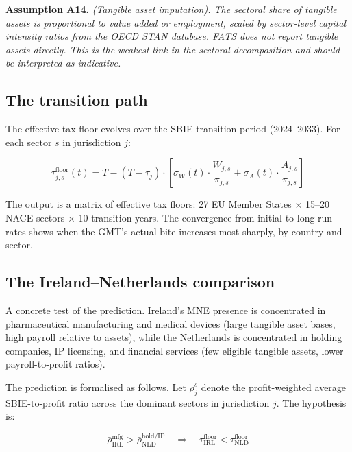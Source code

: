 \documentclass[11pt,a4paper]{article}
\newcommand{\assumption}[2]{\noindent\textbf{Assumption #1.} \textit{#2}\medskip}
\begin{document}
\assumption{A14}{(Tangible asset imputation). The sectoral share of tangible assets is proportional to value added or employment, scaled by sector-level capital intensity ratios from the OECD STAN database. FATS does not report tangible assets directly. This is the weakest link in the sectoral decomposition and should be interpreted as indicative.}

\subsection{The transition path}\label{sec:transition}

The effective tax floor evolves over the SBIE transition period (2024--2033). For each sector $s$ in jurisdiction $j$:

\begin{equation}\label{eq:floor_transition}
\tau_{j,s}^{\text{floor}}(t) = T - (T - \tau_j) \cdot \left[\sigma_W(t) \cdot \frac{W_{j,s}}{\pi_{j,s}} + \sigma_A(t) \cdot \frac{A_{j,s}}{\pi_{j,s}}\right]
\end{equation}

The output is a matrix of effective tax floors: 27 EU Member States $\times$ 15--20 NACE sectors $\times$ 10 transition years. The convergence from initial to long-run rates shows when the GMT's actual bite increases most sharply, by country and sector.

\subsection{The Ireland--Netherlands comparison}\label{sec:irl_nld}

A concrete test of the \citet{schjelderup2024} prediction. Ireland's MNE presence is concentrated in pharmaceutical manufacturing and medical devices (large tangible asset bases, high payroll relative to assets), while the Netherlands is concentrated in holding companies, IP licensing, and financial services (few eligible tangible assets, lower payroll-to-profit ratios).

The prediction is formalised as follows. Let $\bar{\rho}_{j}^{s}$ denote the profit-weighted average SBIE-to-profit ratio across the dominant sectors in jurisdiction $j$. The hypothesis is:

\begin{equation}\label{eq:irl_nld_hypothesis}
\bar{\rho}_{\text{IRL}}^{\text{mfg}} > \bar{\rho}_{\text{NLD}}^{\text{hold/IP}} \quad \Longrightarrow \quad \tau_{\text{IRL}}^{\text{floor}} < \tau_{\text{NLD}}^{\text{floor}}
\end{equation}
\end{document}
